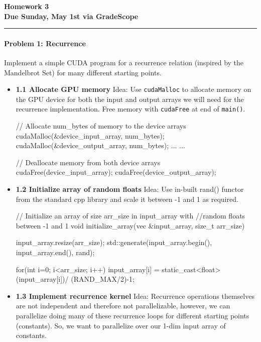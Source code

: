 \documentclass[12pt,letterpaper,twoside]{article}
\begin{document}
{\centering \textbf{Homework 3\\ Due Sunday, May 1st via GradeScope\\}}
\vspace*{-8pt}\noindent\rule{\linewidth}{1pt}

\paragraph{Problem 1: Recurrence } Implement a simple CUDA program for 
a recurrence relation (inspired by the Mandelbrot Set) for many 
different starting points.

\begin{itemize}
    \item \textbf{1.1 Allocate GPU memory} Idea: Use \texttt{cudaMalloc}
    to allocate memory on the GPU device for both the input and output 
    arrays we will need for the recurrence implementation. Free memory 
    with \texttt{cudaFree} at end of \texttt{main()}.

\begin{cpp}
// Allocate num_bytes of memory to the device arrays
cudaMalloc(&device_input_array, num_bytes);
cudaMalloc(&device_output_array, num_bytes);
...
...

// Deallocate memory from both device arrays
cudaFree(device_input_array);
cudaFree(device_output_array);
\end{cpp}

    \item \textbf{1.2 Initialize array of random floats} Idea: Use in-built
    rand() functor from the standard cpp library and scale it between -1 
    and 1 as required.

\begin{cpp}
// Initialize an array of size arr_size in input_array with 
//random floats between -1 and 1
void initialize_array(vec &input_array, size_t arr_size) {
    input_array.resize(arr_size);
    std::generate(input_array.begin(), input_array.end(), rand);

    for(int i=0; i<arr_size; i++){
    input_array[i] = static_cast<float>(input_array[i])/
                        (RAND_MAX/2)-1;
    }    
}
\end{cpp}

    \item \textbf{1.3 Implement recurrence kernel} Idea: Recurrence operations 
    themselves are not independent and therefore not parallelizable, however, 
    we can parallelize doing many of these recurrence loops for different 
    starting points (constants). So, we want to parallelize over our 1-dim 
    input array of constants.


\end{itemize}
\end{document}
